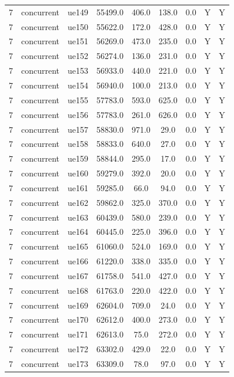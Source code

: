 \begin{table}[ht]
\begin{tabular}{|c|c|c|c|c|c|c|c|c|}
7 & concurrent & ue149 & 55499.0 & 406.0 & 138.0 & 0.0 & Y & Y \\
7 & concurrent & ue150 & 55622.0 & 172.0 & 428.0 & 0.0 & Y & Y \\
7 & concurrent & ue151 & 56269.0 & 473.0 & 235.0 & 0.0 & Y & Y \\
7 & concurrent & ue152 & 56274.0 & 136.0 & 231.0 & 0.0 & Y & Y \\
7 & concurrent & ue153 & 56933.0 & 440.0 & 221.0 & 0.0 & Y & Y \\
7 & concurrent & ue154 & 56940.0 & 100.0 & 213.0 & 0.0 & Y & Y \\
7 & concurrent & ue155 & 57783.0 & 593.0 & 625.0 & 0.0 & Y & Y \\
7 & concurrent & ue156 & 57783.0 & 261.0 & 626.0 & 0.0 & Y & Y \\
7 & concurrent & ue157 & 58830.0 & 971.0 & 29.0 & 0.0 & Y & Y \\
7 & concurrent & ue158 & 58833.0 & 640.0 & 27.0 & 0.0 & Y & Y \\
7 & concurrent & ue159 & 58844.0 & 295.0 & 17.0 & 0.0 & Y & Y \\
7 & concurrent & ue160 & 59279.0 & 392.0 & 20.0 & 0.0 & Y & Y \\
7 & concurrent & ue161 & 59285.0 & 66.0 & 94.0 & 0.0 & Y & Y \\
7 & concurrent & ue162 & 59862.0 & 325.0 & 370.0 & 0.0 & Y & Y \\
7 & concurrent & ue163 & 60439.0 & 580.0 & 239.0 & 0.0 & Y & Y \\
7 & concurrent & ue164 & 60445.0 & 225.0 & 396.0 & 0.0 & Y & Y \\
7 & concurrent & ue165 & 61060.0 & 524.0 & 169.0 & 0.0 & Y & Y \\
7 & concurrent & ue166 & 61220.0 & 338.0 & 335.0 & 0.0 & Y & Y \\
7 & concurrent & ue167 & 61758.0 & 541.0 & 427.0 & 0.0 & Y & Y \\
7 & concurrent & ue168 & 61763.0 & 220.0 & 422.0 & 0.0 & Y & Y \\
7 & concurrent & ue169 & 62604.0 & 709.0 & 24.0 & 0.0 & Y & Y \\
7 & concurrent & ue170 & 62612.0 & 400.0 & 273.0 & 0.0 & Y & Y \\
7 & concurrent & ue171 & 62613.0 & 75.0 & 272.0 & 0.0 & Y & Y \\
7 & concurrent & ue172 & 63302.0 & 429.0 & 22.0 & 0.0 & Y & Y \\
7 & concurrent & ue173 & 63309.0 & 78.0 & 97.0 & 0.0 & Y & Y \\

\end{tabular}
\end{table}
